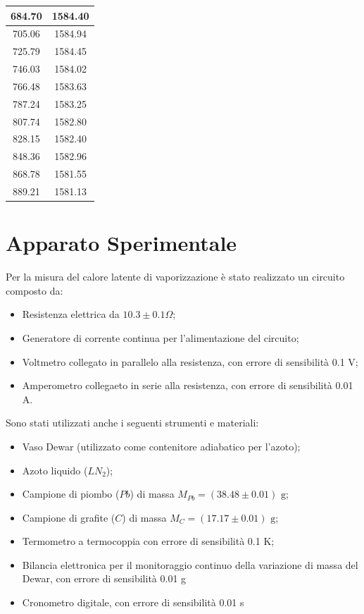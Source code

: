 \documentclass[a4paper,12pt]{article}
\begin{document}
\begin{table}[H]
\begin{minipage}[t]{0.30\textwidth}
\begin{tabular}{|c|c|}
            684.70 & 1584.40 \\ \hline
            705.06 & 1584.94 \\ \hline
            725.79 & 1584.45 \\ \hline
            746.03 & 1584.02 \\ \hline
            766.48 & 1583.63 \\ \hline
            787.24 & 1583.25 \\ \hline
            807.74 & 1582.80 \\ \hline
            828.15 & 1582.40 \\ \hline
            848.36 & 1582.96 \\ \hline
            868.78 & 1581.55 \\ \hline
            889.21 & 1581.13 \\ \hline
        \end{tabular}
    \end{minipage}
\end{table}
\fi

\section{Apparato Sperimentale}
Per la misura del calore latente di vaporizzazione è stato realizzato un circuito composto da:
\begin{itemize}
    \item Resistenza elettrica da $10.3 \pm 0.1 \Omega$;
    \item Generatore di corrente continua per l'alimentazione del circuito;
    \item Voltmetro collegato in parallelo alla resistenza, con errore di sensibilità 0.1 V;
    \item Amperometro collegaeto in serie alla resistenza, con errore di sensibilità 0.01 A.
\end{itemize}

Sono stati utilizzati anche i seguenti strumenti e materiali:
\begin{itemize}
    \item Vaso Dewar (utilizzato come contenitore adiabatico per l'azoto);
    \item Azoto liquido ($LN_2$);
    \item Campione di piombo ($Pb$) di massa $M_{Pb} = (38.48 \pm 0.01)\text{ g}$;
    \item Campione di grafite ($C$) di massa $M_C = (17.17 \pm 0.01)\text{ g}$;
    \item Termometro a termocoppia con errore di sensibilità 0.1 K;
    \item Bilancia elettronica per il monitoraggio continuo della variazione di massa del Dewar, con errore di sensibilità 0.01 g
    \item Cronometro digitale, con errore di sensibilità 0.01 s
\end{itemize}
\end{document}
